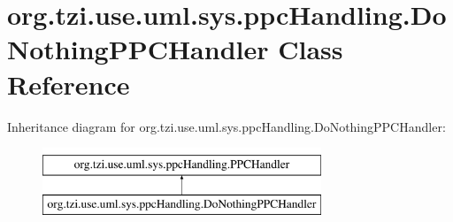 \hypertarget{classorg_1_1tzi_1_1use_1_1uml_1_1sys_1_1ppc_handling_1_1_do_nothing_p_p_c_handler}{\section{org.\-tzi.\-use.\-uml.\-sys.\-ppc\-Handling.\-Do\-Nothing\-P\-P\-C\-Handler Class Reference}
\label{classorg_1_1tzi_1_1use_1_1uml_1_1sys_1_1ppc_handling_1_1_do_nothing_p_p_c_handler}
}
Inheritance diagram for org.\-tzi.\-use.\-uml.\-sys.\-ppc\-Handling.\-Do\-Nothing\-P\-P\-C\-Handler\-:\begin{figure}[H]
\begin{center}
\leavevmode
\includegraphics[height=2.000000cm]{classorg_1_1tzi_1_1use_1_1uml_1_1sys_1_1ppc_handling_1_1_do_nothing_p_p_c_handler}
\end{center}
\end{figure}
